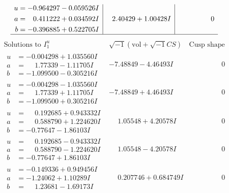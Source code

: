 \documentclass[1p]{elsarticle_modified}
\theoremstyle{definition}
\newcommand{\I}{\sqrt{-1}}
\begin{document}
$$\begin{array}{c|c|c}
\begin{aligned}
u &= -0.964297 - 0.059526 I \\
a &= \phantom{-}0.411222 + 0.034592 I \\
b &= -0.396885 + 0.522705 I\end{aligned}
 & \phantom{-}2.40429 + 1.00428 I & \phantom{-0.000000 } 0\\
 \hline 
 \end{array}$$\newpage$$\begin{array}{c|c|c}  
\text{Solutions to }I^u_{1}& \I (\text{vol} + \sqrt{-1}CS) & \text{Cusp shape}\\
 \hline 
\begin{aligned}
u &= -0.004298 + 1.035560 I \\
a &= \phantom{-}1.77339 - 1.11705 I \\
b &= -1.099500 - 0.305216 I\end{aligned}
 & -7.48849 - 4.46493 I & \phantom{-0.000000 } 0 \\ \hline\begin{aligned}
u &= -0.004298 - 1.035560 I \\
a &= \phantom{-}1.77339 + 1.11705 I \\
b &= -1.099500 + 0.305216 I\end{aligned}
 & -7.48849 + 4.46493 I & \phantom{-0.000000 } 0 \\ \hline\begin{aligned}
u &= \phantom{-}0.192685 + 0.943332 I \\
a &= \phantom{-}0.588790 + 1.224620 I \\
b &= -0.77647 - 1.86103 I\end{aligned}
 & \phantom{-}1.05548 + 4.20578 I & \phantom{-0.000000 } 0 \\ \hline\begin{aligned}
u &= \phantom{-}0.192685 - 0.943332 I \\
a &= \phantom{-}0.588790 - 1.224620 I \\
b &= -0.77647 + 1.86103 I\end{aligned}
 & \phantom{-}1.05548 - 4.20578 I & \phantom{-0.000000 } 0 \\ \hline\begin{aligned}
u &= -0.149336 + 0.949456 I \\
a &= -1.24062 + 1.10289 I \\
b &= \phantom{-}1.23681 - 1.69173 I\end{aligned}
 & \phantom{-}0.207746 + 0.684749 I & \phantom{-0.000000 } 0 \\ \hline\begin{aligned}

\end{aligned}
\end{array}$$
\end{document}
